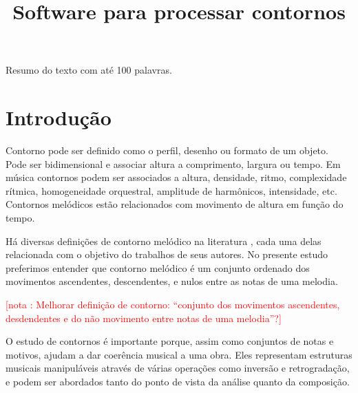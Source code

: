 \documentclass[brazil]{article}
\newcounter{notacounter}
\newcommand{\note}[1]{
  \addtocounter{notacounter}{1}
  \textcolor{red}{[nota \arabic{notacounter}: #1]}
}
\begin{document}
\graphicspath{{figs/}{out/}{data/}{lily/}}

\title{Software para processar contornos}
\author{}{}{}{}

\begin{sumario}
  Resumo do texto com até 100 palavras.  
\end{sumario}








\section{Introdução}
\label{sec:introducao}

Contorno pode ser definido como o perfil, desenho ou formato de um
objeto. Pode ser bidimensional e associar altura a comprimento,
largura ou tempo. Em música contornos podem ser associados a altura,
densidade, ritmo, complexidade rítmica, homogeneidade orquestral,
amplitude de harmônicos, intensidade, etc. Contornos melódicos estão
relacionados com movimento de altura em função do tempo.

Há diversas definições de contorno melódico na literatura
\cite{piston59:harmony,toch77:shaping,schonberg:fundamentals,adams76:melodic,marvin.ea87:relating,morris87:composition,clifford95:contour,beard03:contour},
cada uma delas relacionada com o objetivo do trabalhos de seus
autores. No presente estudo preferimos entender que contorno melódico
é um conjunto ordenado dos movimentos ascendentes, descendentes, e
nulos entre as notas de uma melodia. \note{Melhorar definição de
  contorno: ``conjunto dos movimentos ascendentes, desdendentes e do
  não movimento entre notas de uma melodia''?}


O estudo de contornos é importante porque, assim como conjuntos de
notas e motivos, ajudam a dar coerência musical a uma obra. Eles
representam estruturas musicais manipuláveis através de várias
operações como inversão e retrogradação, e podem ser abordados tanto
do ponto de vista da análise quanto da composição.
\end{document}
